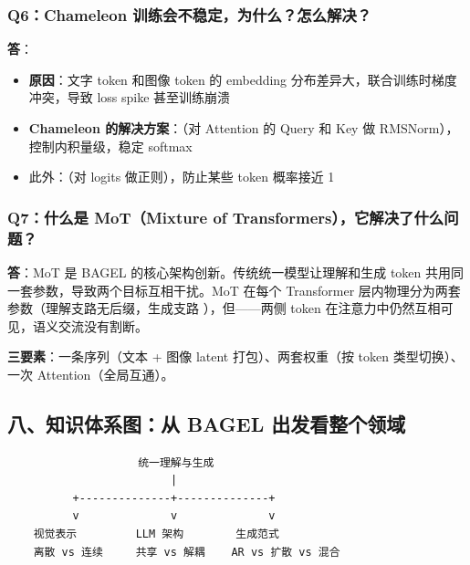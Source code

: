 \subsubsection{Q6：Chameleon 训练会不稳定，为什么？怎么解决？}

\begin{summarybox}
\textbf{答}：
\begin{itemize}
  \item \textbf{原因}：文字 token 和图像 token 的 embedding 分布差异大，联合训练时梯度冲突，导致 loss spike 甚至训练崩溃
  \item \textbf{Chameleon 的解决方案}：（对 Attention 的 Query 和 Key 做 RMSNorm），控制内积量级，稳定 softmax
  \item 此外：（对 logits 做正则），防止某些 token 概率接近 1
\end{itemize}
\end{summarybox}

\subsubsection{Q7：什么是 MoT（Mixture of Transformers），它解决了什么问题？}

\begin{summarybox}
\textbf{答}：MoT 是 BAGEL 的核心架构创新。传统统一模型让理解和生成 token 共用同一套参数，导致两个目标互相干扰。MoT 在每个 Transformer 层内物理分为两套参数（理解支路无后缀，生成支路 ），但——两侧 token 在注意力中仍然互相可见，语义交流没有割断。

\textbf{三要素}：一条序列（文本 + 图像 latent 打包）、两套权重（按 token 类型切换）、一次 Attention（全局互通）。
\end{summarybox}

\subsection{八、知识体系图：从 BAGEL 出发看整个领域}

\begin{lstlisting}
                    统一理解与生成
                         |
          +--------------+--------------+
          v              v              v
    视觉表示         LLM 架构        生成范式
    离散 vs 连续     共享 vs 解耦    AR vs 扩散 vs 混合
\end{lstlisting}

